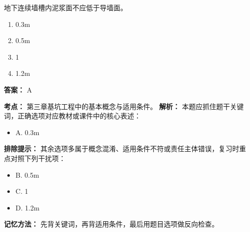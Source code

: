 \documentclass[UTF8,fontset=fandol,11pt]{ctexart}
\begin{document}
\begin{quizbox}[title={第 5 题}]
地下连续墙槽内泥浆面不应低于导墙面。\\
\begin{enumerate}[label=\Alph*.]
\item 0.3m
\item 0.5m
\item 1
\item 1.2m
\end{enumerate}
\textbf{答案：} A
\vspace{0.25em}
\begin{answerbox}[title={考点解析}]
\textbf{考点：} 第三章基坑工程中的基本概念与适用条件。
\textbf{解析：} 本题应抓住题干关键词，正确选项对应教材或课件中的核心表述：
\begin{itemize}
\item A. 0.3m
\end{itemize}
\textbf{排除提示：} 其余选项多属于概念混淆、适用条件不符或责任主体错误，复习时重点对照下列干扰项：
\begin{itemize}
\item B. 0.5m
\item C. 1
\item D. 1.2m
\end{itemize}
\textbf{记忆方法：} 先背关键词，再背适用条件，最后用题目选项做反向检查。
\end{answerbox}
\end{quizbox}

\vspace{0.2em}
\end{document}
